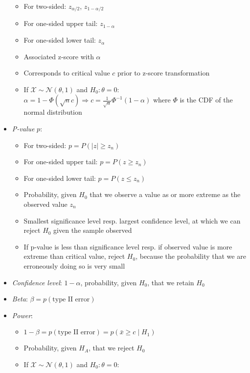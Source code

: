 \begin{itemize}
    \begin{itemize}
        \item For two-sided: $z_{\alpha/2}$, $z_{1 - \alpha/2}$
        \item For one-sided upper tail: $z_{1 - \alpha}$
        \item For one-sided lower tail: $z_{\alpha}$
        \item Associated z-score with $\alpha$
        \item Corresponds to critical value $c$ prior to z-score transformation
        \item If $\mathcal{X} \sim \mathcal{N}(\theta,1)$ and $H_0: \theta = 0$:
        $\alpha = 1-\Phi(\sqrt{n}c) \Rightarrow c = \frac{1}{\sqrt{n}} \Phi^{-1}(1 - \alpha)$ where $\Phi$ is the CDF of the normal distribution
    \end{itemize}
    \item \emph{P-value} $p$: 
    \begin{itemize}
        \item For two-sided: $p = P(|z| \geq z_n)$
        \item For one-sided upper tail: $p = P(z \geq z_n)$
        \item For one-sided lower tail: $p = P(z \leq z_n)$
        \item Probability, given $H_0$ that we observe a value as or more extreme as the observed value $z_n$ 
        \item Smallest significance level resp. largest confidence level, at which we can reject $H_0$ given the sample observed
        \item If p-value is less than significance level resp. if observed value is more extreme than critical value, reject $H_0$, because the probability that we are erroneously doing so is very small
    \end{itemize}
    \item \emph{Confidence level}: $1-\alpha$, probability, given $H_0$, that we retain $H_0$
    \item \emph{Beta}: $\beta = p(\textrm{type II error})$
    \item \emph{Power}: 
    \begin{itemize}
        \item $1-\beta = p(\textrm{type II error}) = p(\bar{x} \geq c \mid H_1)$
        \item Probability, given $H_A$, that we reject $H_0$
        \item If $\mathcal{X} \sim \mathcal{N}(\theta,1)$ and $H_0: \theta = 0$:

\end{itemize}
\end{itemize}
